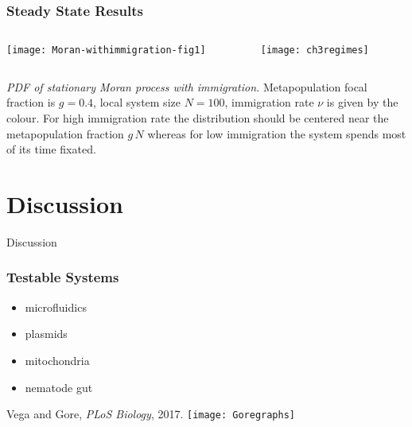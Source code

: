 \documentclass{beamer}
\begin{document}
\begin{frame}
\frametitle{Steady State Results}
\begin{columns}
	\begin{column}{6cm}
		\begin{center}
			\texttt{[image: Moran-withimmigration-fig1]}
		\end{center}
	\end{column}
	\begin{column}{5cm}
		\begin{center}
			\texttt{[image: ch3regimes]}
		\end{center}
	\end{column}
\end{columns}
\justifying
\footnotesize{
\emph{PDF of stationary Moran process with immigration.} 
Metapopulation focal fraction is $g=0.4$, local system size $N=100$, immigration rate $\nu$ is given by the colour. 
For high immigration rate the distribution should be centered near the metapopulation fraction $g\,N$ whereas for low immigration the system spends most of its time fixated. 
}
\end{frame}



\section[Discussion]{Discussion}

\begin{frame}
\centering
{{\Huge Discussion}}
\end{frame}


\begin{frame}
\frametitle{Testable Systems}
\begin{itemize}
	\item microfluidics
	\pause
	\item plasmids
	\pause
	\item mitochondria
	\pause
	\item nematode gut
\end{itemize}
\pause
\centering
Vega and Gore, \emph{PLoS Biology}, 2017.
\texttt{[image: Goregraphs]}
\end{frame}
\end{document}
